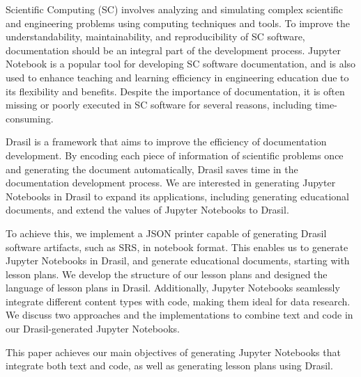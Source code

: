 
Scientific Computing (SC) involves analyzing and simulating complex scientific 
and engineering problems using computing techniques and tools. To improve the 
understandability, maintainability, and reproducibility of SC software,  
documentation should be an integral part of the development process. Jupyter 
Notebook is a popular tool for developing SC software documentation, and is 
also used to enhance teaching and learning efficiency in engineering education 
due to its flexibility and benefits. Despite the importance of documentation, 
it is often missing or poorly executed in SC software for several reasons, 
including time-consuming. 

Drasil is a framework that aims to improve the efficiency of documentation 
development. By encoding each piece of information of scientific problems once 
and generating the document automatically, Drasil saves time in the 
documentation development process. We are interested in generating Jupyter 
Notebooks in Drasil to expand its applications, including generating 
educational documents, and extend the values of Jupyter Notebooks to Drasil.

To achieve this, we implement a JSON printer capable of generating Drasil 
software artifacts, such as SRS, in notebook format. This enables us to 
generate Jupyter Notebooks in Drasil, and generate educational documents, 
starting with lesson plans. We develop the structure of our lesson plans and 
designed the language of lesson plans in Drasil. Additionally, Jupyter 
Notebooks seamlessly integrate different content types with code, making them 
ideal for data research. We discuss two approaches and the implementations to 
combine text and code in our Drasil-generated Jupyter Notebooks. 

This paper achieves our main objectives of generating Jupyter Notebooks that 
integrate both text and code, as well as generating lesson plans using Drasil.